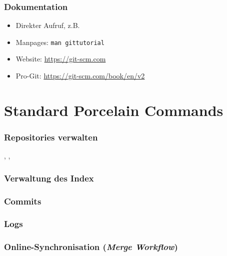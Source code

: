 \documentclass{cms-kurs}
\begin{document}
\begin{frame}
  \frametitle{Dokumentation}

  \onslide<+->

  \begin{itemize}
  \item Direkter Aufruf, z.B.{} 
  \item Manpages: \lstinline{man gittutorial}
  \item Website: \url{https://git-scm.com}
  \item Pro-Git: \url{https://git-scm.com/book/en/v2}
  \end{itemize}

\end{frame}

\section{Standard Porcelain Commands}

\begin{frame}
  \frametitle{Repositories verwalten}

  \onslide<+->

  , , 

\end{frame}

\begin{frame}
  \frametitle{Verwaltung des Index}

  \onslide<+->


\end{frame}

\begin{frame}
  \frametitle{Commits}

  \onslide<+->


\end{frame}

\begin{frame}
  \frametitle{Logs}

  \onslide<+->


\end{frame}

\begin{frame}
  \frametitle{Online-Synchronisation (\emph{Merge Workflow})}

  \onslide<+->


\end{frame}
\end{document}
